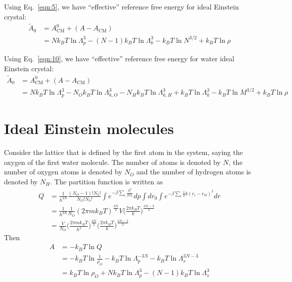 \documentclass[aps,pre,a4paper,showkeys,fleqn]{revtex4}
\newcommand{\com}[0]{{\textrm{CM}}}
\begin{document}
Using Eq.~\eqref{eqn:5}, we  have ``effective'' reference free energy for ideal Einstein crystal:
\begin{align} \nonumber
  \tilde A_0
  &=
    A^0_\com + (A - A_\com) \\
  &=
    Nk_BT\ln \Lambda_p^3 - (N-1)k_BT\ln\Lambda_k^3 - k_BT\ln N^{3/2} + k_BT\ln \rho
\end{align}

Using Eq.~\eqref{eqn:10}, we  have ``effective'' reference free energy for water ideal Einstein crystal:
\begin{align} \nonumber
  \tilde A_0
  &=
    A^0_\com + (A - A_\com) \\
  &=
    Nk_BT\ln \Lambda_p^3
    -N_Ok_BT\ln\Lambda_{k,O}^3
    -N_Hk_BT\ln\Lambda_{k,H}^3
    + k_BT\ln\Lambda_k^3
    - k_BT\ln M^{3/2} + k_BT\ln \rho
\end{align}






\section{Ideal Einstein molecules}
Consider the lattice that is defined by the first atom in the system, saying the oxygen of the first water molecule.
The number of atoms is denoted by $N$, the number of oxygen atoms is denoted by $N_O$ and the number of hydrogen atoms is denoted by $N_H$.
The partition function is written as
\begin{align*}
  Q & = \frac{1}{h^{3N}}
      \frac{(N_O-1)!N_h!}{N_O!N_h!}
      \int e^{-\beta\sum_i\frac{p_i^2}{2m_i}} dp
      \int dr_0\int e^{-\beta\sum_i \frac 12k(r_i - r_{i0})^2} dr \\
    &=
      \frac{1}{h^{3N}}\frac{1}{N_O}
      (2\pi m k_BT)^{\frac{3N}{2}}
      {V}
      \Big(\frac{2\pi k_BT}{k}\Big)^{\frac{3N-3}2} \\
    &=
      \frac{V}{N_O}
      \Big( \frac{2\pi m k_BT}{h^2} \Big)^{\frac{3N}{2}}
      \Big( \frac{2\pi k_BT}{k} \Big)^{\frac{3N-3}{2}}
\end{align*}
Then
\begin{align*}
  A
  &=
    -k_BT \ln Q \\
  &=
    -k_BT \ln \frac1{\rho_O} - k_BT \ln \Lambda_p^{-3N} - k_BT \ln \Lambda_s^{3N-3} \\
  &=
    k_BT \ln {\rho_O} + Nk_BT \ln \Lambda_p^3 - (N-1) k_BT \ln \Lambda_s^3
\end{align*}
\end{document}
